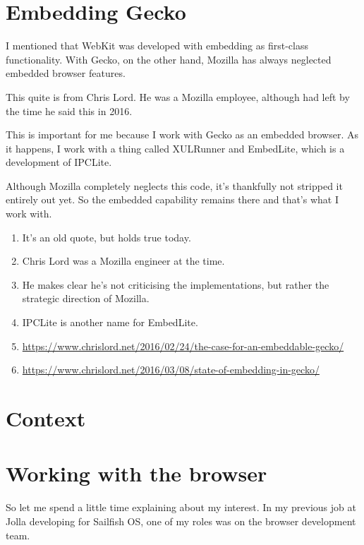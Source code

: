 \documentclass{article}
\begin{document}

\section{Embedding Gecko}

I mentioned that WebKit was developed with embedding as first-class functionality. With Gecko, on the other hand, Mozilla has always neglected embedded browser features.

This quite is from Chris Lord. He was a Mozilla employee, although had left by the time he said this in 2016.

This is important for me because I work with Gecko as an embedded browser. As it happens, I work with a thing called XULRunner and EmbedLite, which is a development of IPCLite.

Although Mozilla completely neglects this code, it's thankfully not stripped it entirely out yet. So the embedded capability remains there and that's what I work with.

\begin{enumerate}
\item It's an old quote, but holds true today.
\item Chris Lord was a Mozilla engineer at the time.
\item He makes clear he's not criticising the implementations, but rather the strategic direction of Mozilla.
\item IPCLite is another name for EmbedLite.
\item \url{https://www.chrislord.net/2016/02/24/the-case-for-an-embeddable-gecko/}
\item \url{https://www.chrislord.net/2016/03/08/state-of-embedding-in-gecko/}
\end{enumerate}


\section{Context}


\section{Working with the browser}

So let me spend a little time explaining about my interest. In my previous job at Jolla developing for Sailfish OS, one of my roles was on the browser development team.
\end{document}
